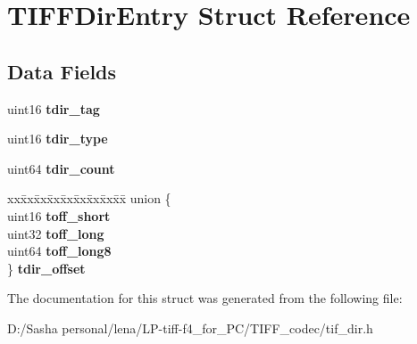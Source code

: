 \hypertarget{struct_t_i_f_f_dir_entry}{}\section{T\+I\+F\+F\+Dir\+Entry Struct Reference}
\label{struct_t_i_f_f_dir_entry}
\subsection*{Data Fields}
\begin{DoxyCompactItemize}
\item 
\hypertarget{struct_t_i_f_f_dir_entry_a34d79b452d694a3d40990245241d3a0d}{}uint16 {\bfseries tdir\+\_\+tag}\label{struct_t_i_f_f_dir_entry_a34d79b452d694a3d40990245241d3a0d}

\item 
\hypertarget{struct_t_i_f_f_dir_entry_a0aade403cadecf7d083bc16fa7826c5a}{}uint16 {\bfseries tdir\+\_\+type}\label{struct_t_i_f_f_dir_entry_a0aade403cadecf7d083bc16fa7826c5a}

\item 
\hypertarget{struct_t_i_f_f_dir_entry_a95976967f4cc7b5a344c1c09032a2b47}{}uint64 {\bfseries tdir\+\_\+count}\label{struct_t_i_f_f_dir_entry_a95976967f4cc7b5a344c1c09032a2b47}

\item 
\hypertarget{struct_t_i_f_f_dir_entry_a8a3ca036ad4cb9c7c841ea1f943dc34a}{}\begin{tabbing}
xx\=xx\=xx\=xx\=xx\=xx\=xx\=xx\=xx\=\kill
union \{\\
\>uint16 {\bfseries toff\_short}\\
\>uint32 {\bfseries toff\_long}\\
\>uint64 {\bfseries toff\_long8}\\
\} {\bfseries tdir\_offset}\label{struct_t_i_f_f_dir_entry_a8a3ca036ad4cb9c7c841ea1f943dc34a}
\\

\end{tabbing}\end{DoxyCompactItemize}


The documentation for this struct was generated from the following file\+:\begin{DoxyCompactItemize}
\item 
D\+:/\+Sasha personal/lena/\+L\+P-\/tiff-\/f4\+\_\+for\+\_\+\+P\+C/\+T\+I\+F\+F\+\_\+codec/tif\+\_\+dir.\+h\end{DoxyCompactItemize}

